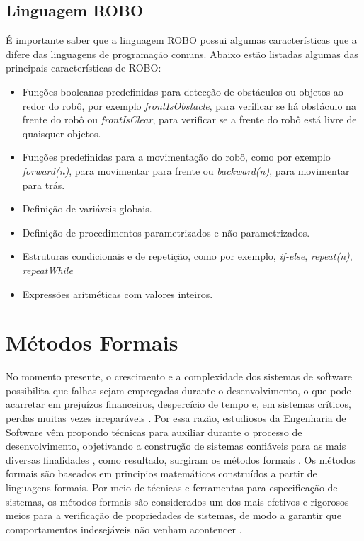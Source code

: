 \subsection{Linguagem ROBO}

É importante saber que a linguagem ROBO possui algumas características que a difere das linguagens de programação comuns. Abaixo estão listadas algumas das principais características de ROBO:

\begin{itemize}
    \item Funções booleanas predefinidas para detecção de obstáculos ou objetos ao redor do robô, por exemplo \textit{frontIsObstacle}, para verificar se há obstáculo na frente do robô ou \textit{frontIsClear}, para verificar se a frente do robô está livre de quaisquer objetos.
    \item Funções predefinidas para a movimentação do robô, como por exemplo \textit{forward(n)}, para movimentar para frente ou \textit{backward(n)}, para movimentar para trás.
    \item Definição de variáveis globais.
    \item Definição de procedimentos parametrizados e não parametrizados.
    \item Estruturas condicionais e de repetição, como por exemplo, \textit{if-else}, \textit{repeat(n)}, \textit{repeatWhile}
    \item Expressões aritméticas com valores inteiros.
\end{itemize}

\section{Métodos Formais}

No momento presente, o crescimento e a complexidade dos sistemas de software possibilita que falhas sejam empregadas durante o desenvolvimento, o que pode acarretar em prejuízos financeiros, despercício de tempo e, em sistemas críticos, perdas muitas vezes irreparáveis \cite{Clarke:1996}. Por essa razão, estudiosos da Engenharia de Software vêm propondo técnicas para auxiliar durante o processo de desenvolvimento, objetivando a construção de sistemas confiáveis para as mais diversas finalidades , como resultado, surgiram os métodos formais \cite{rui_silva}. Os métodos formais são baseados em principios matemáticos construídos a partir de linguagens formais. Por meio de técnicas e ferramentas para especificação de sistemas, os métodos formais são considerados um dos mais efetivos e rigorosos meios para a verificação de propriedades de sistemas, de modo a garantir que comportamentos indesejáveis não venham acontencer \cite{bhatt}.

